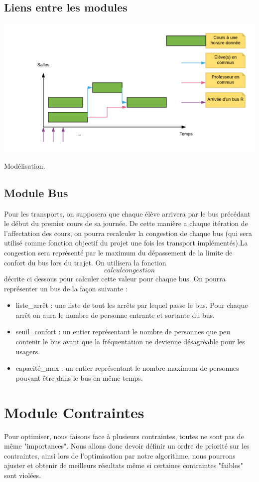 \documentclass[a4paper,11pt]{article}
\begin{document}
	\subsection{Liens entre les modules}
		\centerline{\includegraphics[scale=0.5]{modelter.png}}
		Modélisation.\\
	\subsection{Module Bus}
	Pour les transports, on supposera que chaque élève arrivera par le bus précédant le début du premier cours de sa journée. 
	De cette manière a chaque itération de l'affectation des cours, on pourra recalculer la congestion de chaque bus
	(qui sera utilisé comme fonction objectif du projet une fois les transport implémentés).La congestion sera représenté par le maximum du dépassement de la limite de confort du bus lors du trajet.
	On utilisera la fonction $$calcul congestion$$ décrite ci dessous pour calculer cette valeur pour chaque bus.
	On pourra représenter un bus de la façon suivante :\\
	\begin{itemize}
		\item liste\_arrêt : une liste de tout les arrêts par lequel passe le bus. Pour chaque arrêt on aura le nombre de personne entrante et sortante du bus.
		\item seuil\_confort : un entier représentant le nombre de personnes que peu contenir le bus avant que la fréquentation ne devienne désagréable pour les usagers.
		\item capacité\_max : un entier représentant le nombre maximum de personnes pouvant être dans le bus en même temps.
	\end{itemize}
\section{Module Contraintes}
	Pour optimiser, nous faisons face à plusieurs contraintes, toutes ne sont pas 
	de même "importances". Nous allons donc devoir définir un ordre de priorité sur 
	les contraintes, ainsi lors de l'optimisation par notre algorithme, nous 
	pourrons ajuster et obtenir de meilleurs résultats même si certaines contraintes
	"faibles" sont violées.\\
\end{document}
